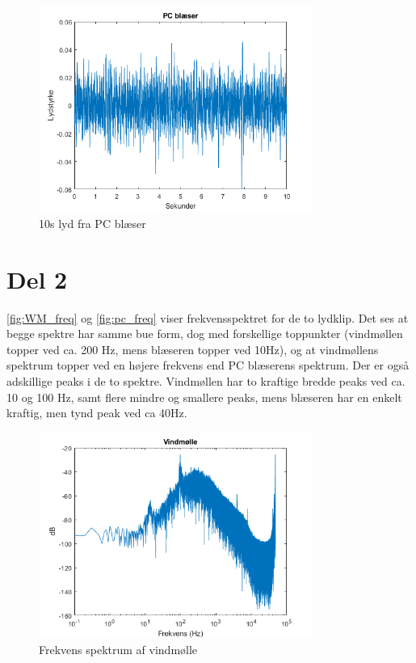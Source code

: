 \begin{figure}[h]
\centering
\includegraphics[width=0.8\textwidth]{"figures/pcFan_10s"}
\caption{10s lyd fra PC blæser}
\label{fig:pc_10s}
\end{figure}

\section{Del 2}

\autoref{fig:WM_freq} og \autoref{fig:pc_freq} viser frekvensspektret for de to lydklip. Det ses at begge spektre har samme bue form, dog med forskellige toppunkter (vindmøllen topper ved ca. 200 Hz, mens blæseren topper ved 10Hz), og at vindmøllens spektrum topper ved en højere frekvens end PC blæserens spektrum. Der er også adskillige peaks i de to spektre. Vindmøllen har to kraftige bredde peaks ved ca. 10 og 100 Hz, samt flere mindre og smallere peaks, mens blæseren har en enkelt kraftig, men tynd peak ved ca 40Hz. 


\begin{figure}[h]
\centering
\includegraphics[width=0.8\textwidth]{"figures/Windmill_frekvens"}
\caption{Frekvens spektrum af vindmølle}
\label{fig:WM_freq}
\end{figure}

